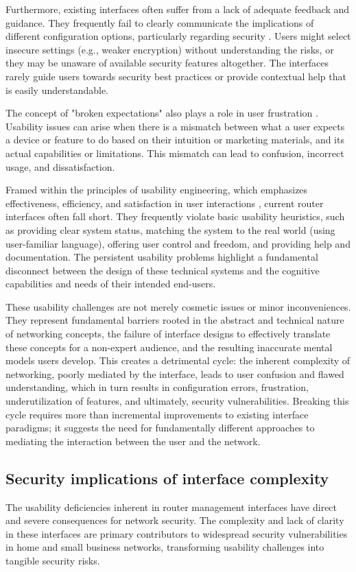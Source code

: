 Furthermore, existing interfaces often suffer from a lack of adequate feedback and guidance. They frequently fail to clearly communicate the implications of different configuration options, particularly regarding security \cite{home_network_challenges}. Users might select insecure settings (e.g., weaker encryption) without understanding the risks, or they may be unaware of available security features altogether. The interfaces rarely guide users towards security best practices or provide contextual help that is easily understandable.

The concept of "broken expectations" also plays a role in user frustration \cite{diagnostic_issues}. Usability issues can arise when there is a mismatch between what a user expects a device or feature to do based on their intuition or marketing materials, and its actual capabilities or limitations. This mismatch can lead to confusion, incorrect usage, and dissatisfaction.

Framed within the principles of usability engineering, which emphasizes effectiveness, efficiency, and satisfaction in user interactions \cite{network_complexity_survey}, current router interfaces often fall short. They frequently violate basic usability heuristics, such as providing clear system status, matching the system to the real world (using user-familiar language), offering user control and freedom, and providing help and documentation. The persistent usability problems highlight a fundamental disconnect between the design of these technical systems and the cognitive capabilities and needs of their intended end-users.

These usability challenges are not merely cosmetic issues or minor inconveniences. They represent fundamental barriers rooted in the abstract and technical nature of networking concepts, the failure of interface designs to effectively translate these concepts for a non-expert audience, and the resulting inaccurate mental models users develop. This creates a detrimental cycle: the inherent complexity of networking, poorly mediated by the interface, leads to user confusion and flawed understanding, which in turn results in configuration errors, frustration, underutilization of features, and ultimately, security vulnerabilities. Breaking this cycle requires more than incremental improvements to existing interface paradigms; it suggests the need for fundamentally different approaches to mediating the interaction between the user and the network.

\subsection{Security implications of interface complexity}
The usability deficiencies inherent in router management interfaces have direct and severe consequences for network security. The complexity and lack of clarity in these interfaces are primary contributors to widespread security vulnerabilities in home and small business networks, transforming usability challenges into tangible security risks.

